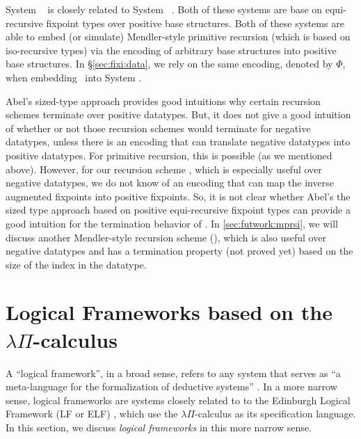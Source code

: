 System \Fwhat\ \cite{abel06phd} is closely related to
System \Fixw\ \cite{AbeMat04}. Both of these systems are base on
equi-recursive fixpoint types over positive base structures.
Both of these systems are able to embed (or simulate) Mendler-style
primitive recursion (which is based on iso-recursive types) via
the encoding \cite{Geu92} of arbitrary base structures into
positive base structures. In \S\ref{sec:fixi:data}, we rely on
the same encoding, denoted by $\Phi$, when embedding \MPr\ into System \Fixi.

Abel's sized-type approach provides good intuitions why 
certain recursion schemes terminate over positive datatypes.
But, it does not give a good intuition of whether or not
those recursion schemes would terminate for negative datatypes,
unless there is an encoding that can translate negative datatypes into
positive datatypes. For primitive recursion, this is possible (as we
mentioned above). However, for our recursion scheme \MsfIt, which is
especially useful over negative datatypes, we do not know of an encoding
that can map the inverse augmented fixpoints into positive fixpoints.
So, it is not clear whether Abel's the sized type approach based on
positive equi-recursive fixpoint types can provide a good intuition
for the termination behavior of \MsfIt.  In \ref{sec:futwork:mprsi},
we will discuss another Mendler-style recursion scheme (\mprsi), which
is also useful over negative datatypes and has a termination property
(not proved yet) based on the size of the index in the datatype.

\section{Logical Frameworks based on the $\lambda\Pi$-calculus}
\label{sec:relwork:LF}
A ``logical framework'', in a broad sense, refers to
any system that serves as ``a meta-language for
the formalization of deductive systems'' \cite{Pfe02LFintro}.
In a more narrow sense, logical frameworks are systems closely related to
to the Edinburgh Logical Framework (LF or ELF) \cite{Harper87}, which
use the $\lambda\Pi$-calculus as its specification language.
In this section, we discuss \emph{logical frameworks} in this more narrow sense.

